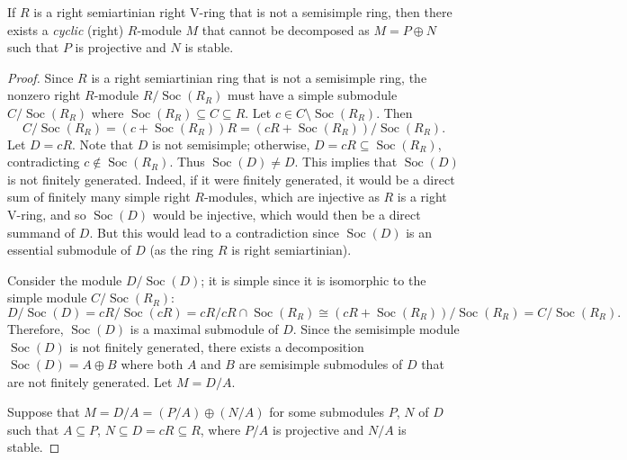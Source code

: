 \documentclass[10pt,a4paper]{amsart}
\newcommand{\Soc}{\operatorname{Soc}}
\begin{document}
\begin{theorem} \label{Ex:Cyclicmodule} If $R$ is a right semiartinian right V-ring that is not a semisimple ring, then there exists a \emph{cyclic} (right) $R$-module $M$ that cannot be decomposed as $M=P\oplus N$ such that $P$ is projective and $N$ is stable.
\end{theorem}

\begin{proof}

Since $R$ is a right semiartinian ring that is not a semisimple ring, the nonzero right $R$-module $R/\Soc(R_R)$ must have a simple submodule $C/\Soc(R_R)$ where $\Soc(R_R)\subseteq C \subseteq R$. Let $c\in C\setminus \Soc(R_R)$. Then \[C/\Soc(R_R)=(c+\Soc(R_R))R=(cR+\Soc(R_R))/\Soc(R_R).\] Let $D=cR$. Note that $D$ is not semisimple; otherwise, $D=cR\subseteq \Soc(R_R)$, contradicting $c \notin \Soc(R_R)$.
Thus $\operatorname{Soc}(D) \neq D$. This implies that $\Soc (D)$ is not finitely generated. Indeed, if it were finitely generated, it would be a direct sum of finitely many simple right
$R$-modules, which are injective as $R$ is a right V-ring, and so $\Soc(D)$ would be injective, which would then be a direct summand of $D$. But this would lead to a contradiction since $\Soc (D)$ is an essential submodule of $D$ (as the ring $R$ is right semiartinian).

Consider the module $D/\Soc(D)$; it is simple since it is isomorphic to the simple module $ C/\Soc(R_R) $:
\[D/\Soc(D)=cR/\Soc(cR)=cR/cR\cap \Soc(R_R)\cong (cR+\Soc(R_R))/\Soc(R_R)= C/\Soc(R_R).\] {Therefore, $\Soc(D)$ is a maximal submodule of $D$. Since the semisimple module} $\Soc(D)$ is not finitely generated, there exists a decomposition $\Soc(D)=A\oplus B$ where both $A$  and $B$ are semisimple submodules of $D$ that are not finitely generated. Let $M=D/A$.

Suppose that $M=D/A=(P/A)\oplus (N/A)$ for some submodules $P$, $N$ of $D$ such that $A\subseteq P$, $N \subseteq D=cR\subseteq R$, where $P/A$ is projective and $N/A$ {is stable}.


\end{proof}
\end{document}
